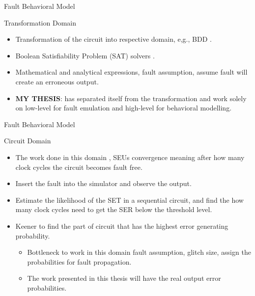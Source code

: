 \documentclass[aspectratio=1610]{beamer}
\begin{document}
\begin{frame}{Fault Behavioral Model}

\begin{block}{Transformation Domain}
\end{block}
\begin{itemize}


\item Transformation of the circuit into respective domain, e,g., BDD \citep{ubar2014modeling}.



\item Boolean Satisfiability Problem (SAT) solvers \citep{shazli2011high}.

\item Mathematical and analytical expressions, fault assumption, assume fault will create an erroneous output.
\end{itemize}
\begin{itemize}
\item \textbf{MY THESIS}: has separated itself from the transformation and work solely on low-level for fault emulation and high-level for behavioral modelling.
\end{itemize} 






\end{frame}




\begin{frame}{Fault Behavioral Model}

\begin{block}{Circuit Domain}

\end{block}
\begin{itemize}
\item The work done in this domain \citep{miskov2007soft}, \citep{miskov2006mars}
 SEUs convergence meaning after how many clock cycles the circuit becomes fault free.
\item Insert the fault into the simulator and observe the output. 


\item Estimate the likelihood of the SET in a sequential circuit, and find the how many clock cycles need to get the SER below the threshold level.
\item Keener to find the part of circuit that has the highest error generating probability.

\begin{itemize}

\item Bottleneck to work in this domain fault assumption, glitch size, assign the probabilities for fault propagation.

\item The work presented in this thesis will have the real output error probabilities.
\end{itemize}

\end{itemize}






\end{frame}
\end{document}
